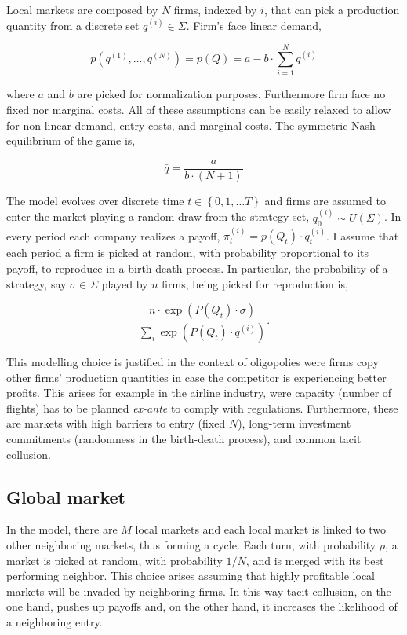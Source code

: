 \documentclass[american]{scrartcl}
\newcommand{\set}[1]{\left\{#1\right\}}
\begin{document}
Local markets are composed by $N$ firms, indexed by $i$, that can pick a production quantity from a discrete set $q^{(i)} \in \Sigma$. Firm's face linear demand,

\begin{equation}
    p(q^{(1)}, \ldots, q^{(N)}) = p(Q)= a - b \cdot \sum^{N}_{i=1} q^{(i)}
\end{equation}

where $a$ and $b$ are picked for normalization purposes. Furthermore firm face no fixed nor marginal costs. All of these assumptions can be easily relaxed to allow for non-linear demand, entry costs, and marginal costs. The symmetric Nash equilibrium of the game is,

\begin{equation}
    \bar{q}= \frac{a}{b \cdot (N+1)}
\end{equation}



The model evolves over discrete time $t \in \set{0, 1, \ldots T}$ and firms are assumed to enter the market playing a random draw from the strategy set,  $q^{(i)}_0 \sim U(\Sigma)$. In every period each company realizes a payoff, $\pi^{(i)}_t = p(Q_t) \cdot q^{(i)}_t$. I assume that each period a firm is picked at random, with probability proportional to its payoff, to reproduce in a birth-death process. In particular, the probability of a strategy, say $\sigma \in \Sigma$ played by $n$ firms, being picked for reproduction is,

\begin{equation}
    \frac{n \cdot \exp(P(Q_t) \cdot \sigma)}{\sum_{i} \exp(P(Q_t) \cdot q^{(i)})}.
\end{equation}



This modelling choice is justified in the context of oligopolies were firms copy other firms' production quantities in case the competitor is experiencing better profits. This arises for example in the airline industry, were capacity (number of flights) has to be planned \textit{ex-ante} to comply with regulations. Furthermore, these are markets with high barriers to entry (fixed $N$), long-term investment commitments (randomness in the birth-death process), and common tacit collusion.

\subsection{Global market}

In the model, there are $M$ local markets and each local market is linked to two other neighboring markets, thus forming a cycle. Each turn, with probability $\rho$, a market is picked at random, with probability $1 / N$, and is merged with its best performing neighbor. This choice arises assuming that highly profitable local markets will be invaded by neighboring firms. In this way tacit collusion, on the one hand, pushes up payoffs and, on the other hand, it increases the likelihood of a neighboring entry.
\end{document}
